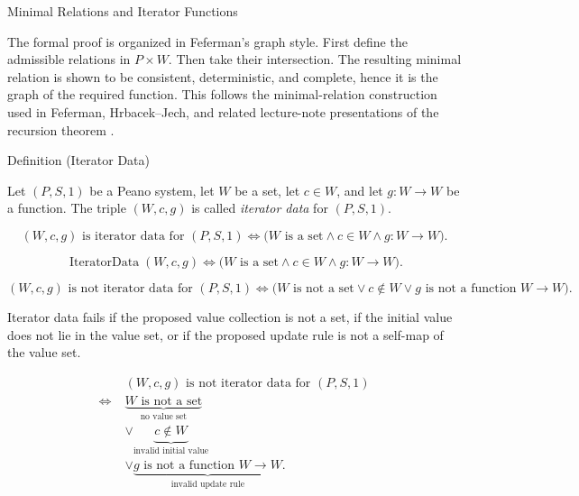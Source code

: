 \begin{topicbox}{Minimal Relations and Iterator Functions}
\begin{exposition}
The formal proof is organized in Feferman's graph style. First define the
admissible relations in $P\times W$. Then take their intersection. The
resulting minimal relation is shown to be consistent, deterministic, and
complete, hence it is the graph of the required function. This follows the
minimal-relation construction used in Feferman, Hrbacek--Jech, and related
lecture-note presentations of the recursion theorem
\citep{FefermanNumberSystems1964,hrbacek_jech1999,chi_recursion_wustl}.
\end{exposition}

\begin{definitionbox}{Definition (Iterator Data)}
\begin{definition}
\label{def:iterator-data-on-peano-system}
Let $(P,S,1)$ be a Peano system, let $W$ be a set, let $c\in W$, and let
$g:W\to W$ be a function. The triple $(W,c,g)$ is called \emph{iterator data}
for $(P,S,1)$.
\end{definition}
\end{definitionbox}

\begin{remark*}
\[
(W,c,g) \text{ is iterator data for } (P,S,1)
\Longleftrightarrow
\bigl(W \text{ is a set}\land c\in W\land g:W\to W\bigr).
\]
\end{remark*}

\begin{remark*}
\[
\operatorname{IteratorData}(W,c,g)
\Longleftrightarrow
\bigl(W \text{ is a set}\land c\in W\land g:W\to W\bigr).
\]
\end{remark*}

\begin{remark*}
\[
(W,c,g) \text{ is not iterator data for } (P,S,1)
\Longleftrightarrow
\bigl(W \text{ is not a set}\lor c\notin W\lor g \text{ is not a function } W\to W\bigr).
\]
\end{remark*}

\begin{remark*}
Iterator data fails if the proposed value collection is not a set, if the
initial value does not lie in the value set, or if the proposed update rule is
not a self-map of the value set.
\end{remark*}

\begin{remark*}
\[
\begin{aligned}
&(W,c,g) \text{ is not iterator data for } (P,S,1)\\
\Longleftrightarrow\;&
\underbrace{W \text{ is not a set}}_{\text{no value set}}\\
&\lor \underbrace{c\notin W}_{\text{invalid initial value}}\\
&\lor \underbrace{g \text{ is not a function } W\to W}_{\text{invalid update rule}}.
\end{aligned}
\]
\end{remark*}


\end{topicbox}

